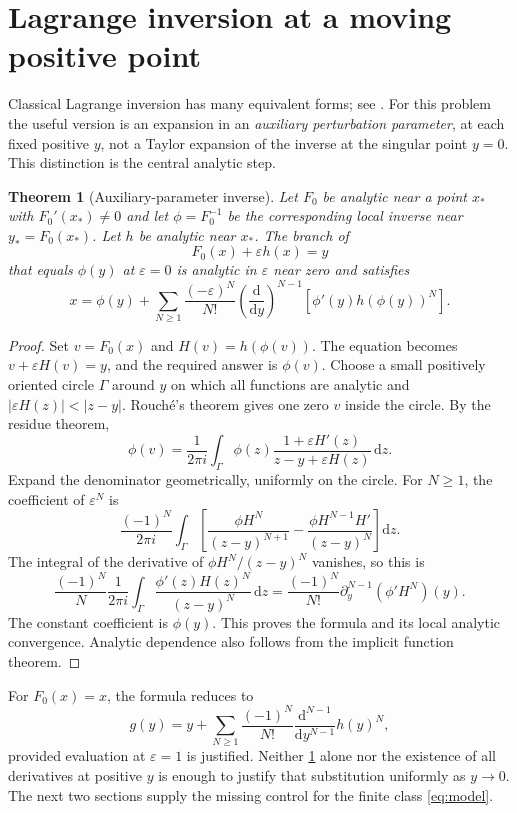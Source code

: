 \documentclass[11pt,a4paper]{article}
\numberwithin{equation}{section}
\newtheorem{theorem}{Theorem}[section]
\theoremstyle{definition}
\newcommand{\dd}{\mathrm d}
\begin{document}
\section{Lagrange inversion at a moving positive point}
\label{sec:lagrange}

Classical Lagrange inversion has many equivalent forms; see
\cite{dlmf,gessel,surya}. For this problem the useful version is an
expansion in an \emph{auxiliary perturbation parameter}, at each fixed
positive $y$, not a Taylor expansion of the inverse at the singular point
$y=0$. This distinction is the central analytic step.

\begin{theorem}[Auxiliary-parameter inverse]\label{thm:parameter}
Let $F_0$ be analytic near a point $x_*$ with $F_0'(x_*)\ne0$ and let
$\phi=F_0^{-1}$ be the corresponding local inverse near $y_*=F_0(x_*)$.
Let $h$ be analytic near $x_*$. The branch of
\[
 F_0(x)+\varepsilon h(x)=y
\]
that equals $\phi(y)$ at $\varepsilon=0$ is analytic in $\varepsilon$ near
zero and satisfies
\begin{equation}\label{eq:param-formula}
 x=\phi(y)+\sum_{N\ge1}\frac{(-\varepsilon)^N}{N!}
 \left(\frac{\dd}{\dd y}\right)^{N-1}
 \left[\phi'(y)h(\phi(y))^N\right].
\end{equation}
\end{theorem}
\begin{proof}
Set $v=F_0(x)$ and $H(v)=h(\phi(v))$. The equation becomes
$v+\varepsilon H(v)=y$, and the required answer is $\phi(v)$. Choose a
small positively oriented circle $\Gamma$ around $y$ on which all
functions are analytic and $|\varepsilon H(z)|<|z-y|$. Rouch\'e's theorem
gives one zero $v$ inside the circle. By the residue theorem,
\[
 \phi(v)=\frac{1}{2\pi i}\int_\Gamma
  \phi(z)\frac{1+\varepsilon H'(z)}{z-y+\varepsilon H(z)}\,\dd z.
\]
Expand the denominator geometrically, uniformly on the circle. For
$N\ge1$, the coefficient of $\varepsilon^N$ is
\[
 \frac{(-1)^N}{2\pi i}\int_\Gamma
 \left[\frac{\phi H^N}{(z-y)^{N+1}}
       -\frac{\phi H^{N-1}H'}{(z-y)^N}\right]\dd z.
\]
The integral of the derivative of $\phi H^N/(z-y)^N$ vanishes, so this is
\[
 \frac{(-1)^N}{N}\frac{1}{2\pi i}\int_\Gamma
   \frac{\phi'(z)H(z)^N}{(z-y)^N}\,\dd z
 =\frac{(-1)^N}{N!}\partial_y^{N-1}(\phi'H^N)(y).
\]
The constant coefficient is $\phi(y)$. This proves the formula and its
local analytic convergence. Analytic dependence also follows from the
implicit function theorem.
\end{proof}

For $F_0(x)=x$, the formula reduces to
\begin{equation}\label{eq:near-identity}
 g(y)=y+\sum_{N\ge1}\frac{(-1)^N}{N!}
 \frac{\dd^{N-1}}{\dd y^{N-1}}h(y)^N,
\end{equation}
provided evaluation at $\varepsilon=1$ is justified. Neither
\cref{thm:parameter} alone nor the existence of all derivatives at positive
$y$ is enough to justify that substitution uniformly as $y\to0$.
The next two sections supply the missing control for the finite class
\eqref{eq:model}.
\end{document}

